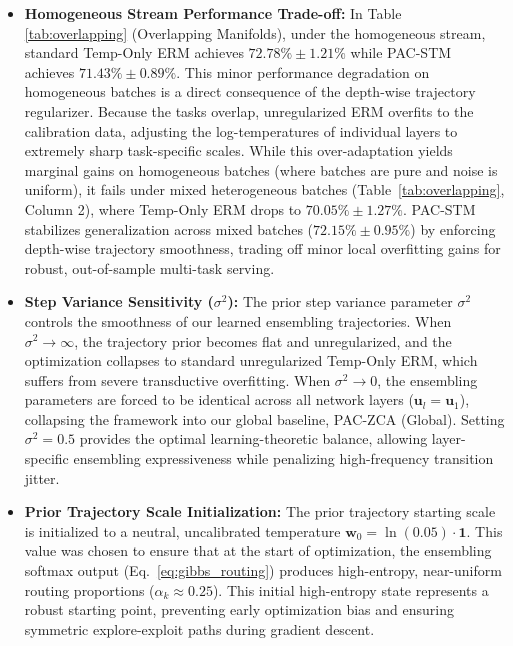 \begin{itemize}
    \item \textbf{Homogeneous Stream Performance Trade-off:} In Table \ref{tab:overlapping} (Overlapping Manifolds), under the homogeneous stream, standard Temp-Only ERM achieves $72.78\% \pm 1.21\%$ while PAC-STM achieves $71.43\% \pm 0.89\%$. This minor performance degradation on homogeneous batches is a direct consequence of the depth-wise trajectory regularizer. Because the tasks overlap, unregularized ERM overfits to the calibration data, adjusting the log-temperatures of individual layers to extremely sharp task-specific scales. While this over-adaptation yields marginal gains on homogeneous batches (where batches are pure and noise is uniform), it fails under mixed heterogeneous batches (Table~\ref{tab:overlapping}, Column 2), where Temp-Only ERM drops to $70.05\% \pm 1.27\%$. PAC-STM stabilizes generalization across mixed batches ($72.15\% \pm 0.95\%$) by enforcing depth-wise trajectory smoothness, trading off minor local overfitting gains for robust, out-of-sample multi-task serving.
    \item \textbf{Step Variance Sensitivity ($\sigma^2$):} The prior step variance parameter $\sigma^2$ controls the smoothness of our learned ensembling trajectories. When $\sigma^2 \to \infty$, the trajectory prior becomes flat and unregularized, and the optimization collapses to standard unregularized Temp-Only ERM, which suffers from severe transductive overfitting. When $\sigma^2 \to 0$, the ensembling parameters are forced to be identical across all network layers ($\mathbf{u}_l = \mathbf{u}_1$), collapsing the framework into our global baseline, PAC-ZCA (Global). Setting $\sigma^2 = 0.5$ provides the optimal learning-theoretic balance, allowing layer-specific ensembling expressiveness while penalizing high-frequency transition jitter.
    \item \textbf{Prior Trajectory Scale Initialization:} The prior trajectory starting scale is initialized to a neutral, uncalibrated temperature $\mathbf{w}_0 = \ln(0.05) \cdot \mathbf{1}$. This value was chosen to ensure that at the start of optimization, the ensembling softmax output (Eq.~\ref{eq:gibbs_routing}) produces high-entropy, near-uniform routing proportions ($\alpha_k \approx 0.25$). This initial high-entropy state represents a robust starting point, preventing early optimization bias and ensuring symmetric explore-exploit paths during gradient descent.

\end{itemize}
